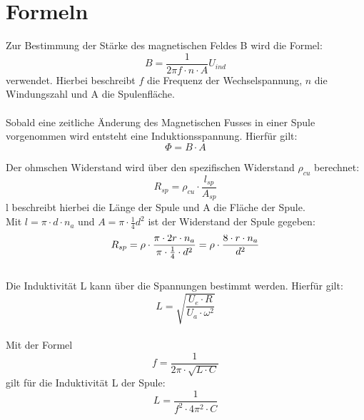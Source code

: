 \chapter{Formeln}
    Zur Bestimmung der Stärke des magnetischen Feldes B wird die Formel:
    \begin{equation}
		B =\frac{1}{2 \pi f \cdot n\cdot A}U_{ind}
	\end{equation}
verwendet. Hierbei beschreibt $f$ die Frequenz der Wechselspannung, $n$ die Windungszahl und A die Spulenfläche.\\
\\
Sobald eine zeitliche Änderung des Magnetischen Fusses in einer Spule vorgenommen wird entsteht eine Induktionsspannung. Hierfür gilt:\\
\begin{equation}
	\Phi=B \cdot A
\end{equation}
	
     Der ohmschen Widerstand wird über den spezifischen Widerstand $\rho_{cu}$ berechnet:\\
  \begin{equation}
    	R_{sp} =  \rho_{cu} \cdot \frac{l_{sp}}{A_{sp}}
        \label{}
  \end{equation}
  l beschreibt hierbei die Länge der Spule und A die Fläche der Spule.\\
  
  Mit $l = \pi \cdot d \cdot n_a$ und $A = \pi \cdot \frac{1}{4} d^2$ ist der Widerstand der Spule gegeben:
    \begin{equation}
    	R_{sp}=\rho\cdot\frac{\pi\cdot 2 r\cdot n_a}{\pi\cdot\frac{1}{4}\cdot d^2} = \rho\cdot\frac{8\cdot r\cdot n_a}{d^2} \\
        \label{spezifischerWiderstand}
    \end{equation}
    \\
    Die Induktivität L kann über die Spannungen bestimmt werden. Hierfür gilt:
    \begin{equation}
    L= \sqrt{\frac{U_e \cdot R}{U_a \cdot \omega^2}}
    \label{InduktivitaetSpannung}
    \end{equation}
  \\
  Mit der Formel
\begin{equation}
	f  = \frac{1}{2\pi\cdot\sqrt{ L\cdot C}}
\end{equation}
gilt für die Induktivität L der Spule:
\begin{equation}
	  L= \frac{1}{f^2 \cdot 4\pi^2 \cdot C} 
      \label{InduktivitaetFrequenz}
\end{equation}
 
        \pagebreak
    